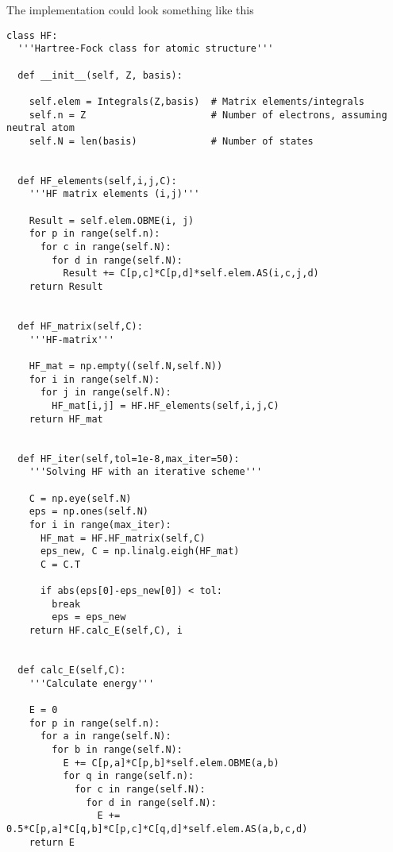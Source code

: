 The implementation could look something like this
\lstset{basicstyle=\scriptsize}
\begin{lstlisting}
class HF:
  '''Hartree-Fock class for atomic structure'''

  def __init__(self, Z, basis):

    self.elem = Integrals(Z,basis)  # Matrix elements/integrals
    self.n = Z                      # Number of electrons, assuming neutral atom
    self.N = len(basis)             # Number of states


  def HF_elements(self,i,j,C):
    '''HF matrix elements (i,j)'''

    Result = self.elem.OBME(i, j)
    for p in range(self.n):
      for c in range(self.N):
        for d in range(self.N):
          Result += C[p,c]*C[p,d]*self.elem.AS(i,c,j,d)
    return Result


  def HF_matrix(self,C):
    '''HF-matrix'''

    HF_mat = np.empty((self.N,self.N))
    for i in range(self.N):
      for j in range(self.N):
        HF_mat[i,j] = HF.HF_elements(self,i,j,C)
    return HF_mat


  def HF_iter(self,tol=1e-8,max_iter=50):
    '''Solving HF with an iterative scheme'''

    C = np.eye(self.N)
    eps = np.ones(self.N)
    for i in range(max_iter):
      HF_mat = HF.HF_matrix(self,C)
      eps_new, C = np.linalg.eigh(HF_mat)
      C = C.T

      if abs(eps[0]-eps_new[0]) < tol:
        break
        eps = eps_new
    return HF.calc_E(self,C), i


  def calc_E(self,C):
    '''Calculate energy'''

    E = 0
    for p in range(self.n):
      for a in range(self.N):
        for b in range(self.N):
          E += C[p,a]*C[p,b]*self.elem.OBME(a,b)
          for q in range(self.n):
            for c in range(self.N):
              for d in range(self.N):
                E += 0.5*C[p,a]*C[q,b]*C[p,c]*C[q,d]*self.elem.AS(a,b,c,d)
    return E
\end{lstlisting}
